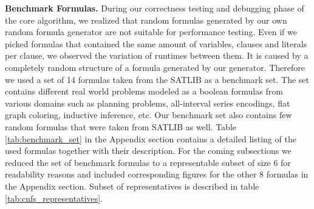 \documentclass[letterpaper]{article}
\newcommand{\mypar}[1]{{\bf #1.}}
\begin{document}
\mypar{Benchmark Formulas} During our correctness testing and debugging phase of the core algorithm, we realized that random formulas generated by our own random formula generator are not suitable for performance testing. Even if we picked formulas that contained the same amount of variables, clauses and literals per clause, we observed the variation of runtimes between them. It is caused by a completely random structure of a formula generated by our generator. Therefore we used a set of 14 formulas taken from the SATLIB as a benchmark set.
The set contains different real world problems modeled as a boolean formulas from various domains such as planning problems, all-interval series encodings, flat graph coloring, inductive inference, etc. Our benchmark set also contains few random formulas that were taken from SATLIB as well. 
Table \ref{tab:benchmark_set} in the Appendix section contains a detailed listing of the used formulas together with their description. For the coming subsections we reduced the set of benchmark formulas to a representable subset of size 6 for readability reasons and included corresponding figures for the other 8 formulas in the Appendix section. Subset of representatives is described in table \ref{tab:cnfs_representatives}.
\end{document}
